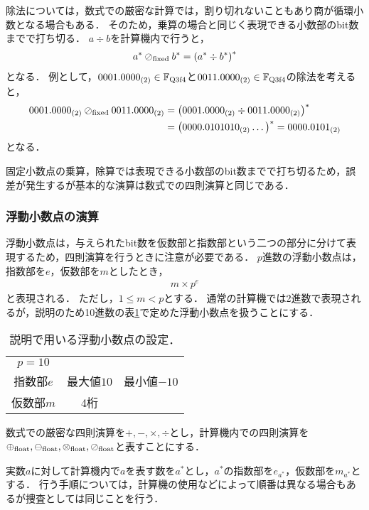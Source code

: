 除法については，数式での厳密な計算では，割り切れないこともあり商が循環小数となる場合もある．
そのため，乗算の場合と同じく表現できる小数部のbit数までで打ち切る．
$a \div b$を計算機内で行うと，
\begin{align*}
    a^{\ast} \oslash_{\mathrm{fixed}} b^{\ast} = \left(a^{\ast} \div b^{\ast}\right)^{\ast}
\end{align*}
となる．
例として，$0001.0000_{(2)} \in \mathbb{F}_{\text{Q}{3}\text{f}{4}}$と$0011.0000_{(2)} \in \mathbb{F}_{\text{Q}{3}\text{f}{4}}$の除法を考えると，
\begin{align*}
    0001.0000_{(2)} \oslash_{\mathrm{fixed}} 0011.0000_{(2)} &= \left(0001.0000_{(2)} \div 0011.0000_{(2)}\right)^{\ast} \\
    &= \left(0000.0101010_{(2)}\dots\right)^{\ast} = 0000.0101_{(2)}
\end{align*}
となる．


固定小数点の乗算，除算では表現できる小数部のbit数までで打ち切るため，誤差が発生するが基本的な演算は数式での四則演算と同じである．

\subsubsection{浮動小数点の演算}
浮動小数点は，与えられたbit数を仮数部と指数部という二つの部分に分けて表現するため，四則演算を行うときに注意が必要である．
$p$進数の浮動小数点は，指数部を$e$，仮数部を$m$としたとき，
\begin{align*}
    m \times p^e
\end{align*}
と表現される．
ただし，$1 \leq m < p$とする．
通常の計算機では2進数で表現されるが，説明のため10進数の表\ref{tab:float_setting}で定めた浮動小数点を扱うことにする．
\begin{table}[H]
    \centering
    \caption{説明で用いる浮動小数点の設定．}
    \begin{tabular}{ccc}
        \hline
        $p=10$ & & \\
        指数部$e$ & 最大値$10$ & 最小値$-10$ \\
        仮数部$m$ & 4桁 &
    \end{tabular}
    \label{tab:float_setting}
\end{table}

数式での厳密な四則演算を$+,-,\times,\div$とし，計算機内での四則演算を$\oplus_{\mathrm{float}},\ominus_{\mathrm{float}},\otimes_{\mathrm{float}},\oslash_{\mathrm{float}}$と表すことにする．

実数$a$に対して計算機内で$a$を表す数を$a^{\ast}$とし，$a^{\ast}$の指数部を$e_{a^{\ast}}$，仮数部を$m_{a^{\ast}}$とする．
行う手順については，計算機の使用などによって順番は異なる場合もあるが捜査としては同じことを行う．


